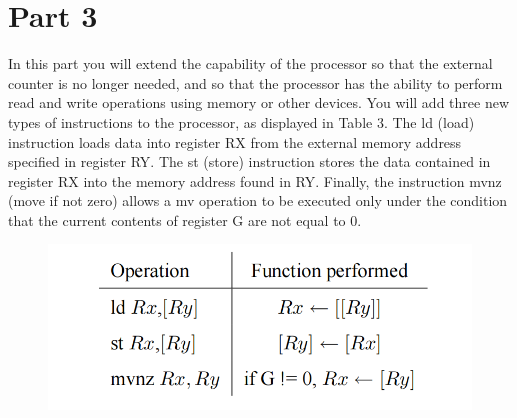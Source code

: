 
\section{Part 3}
In this part you will extend the capability of the processor so that the external counter is no longer needed, and so
that the processor has the ability to perform read and write operations using memory or other devices. You will
add three new types of instructions to the processor, as displayed in Table 3. The ld (load) instruction loads data
into register RX from the external memory address specified in register RY. The st (store) instruction stores the
data contained in register RX into the memory address found in RY. Finally, the instruction mvnz (move if not
zero) allows a mv operation to be executed only under the condition that the current contents of register G are not
equal to 0.\\
\begin{figure}[h]
    \centering
    \includegraphics[scale = 0.6]{source/picture/Lab10/pic1.png}
\end{figure}

